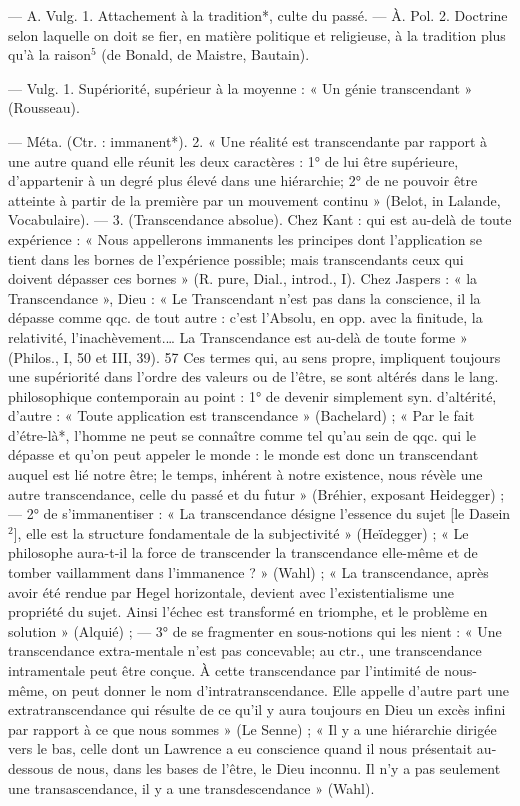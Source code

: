\begin{itemize}[leftmargin=1cm, label=, itemsep=1pt]
 — A. Vulg. 1. Attachement à la tradition*, culte du
passé. — À. Pol. 2. Doctrine selon
laquelle on doit se fier, en matière
politique et religieuse, à la tradition
plus qu’à la raison$^5$ (de Bonald, de
Maistre, Bautain).

 — Vulg. 1.
Supériorité, supérieur à la moyenne :
« Un génie transcendant » (Rousseau).

— Méta. (Ctr. : immanent*). 2.
« Une réalité est transcendante par
rapport à une autre quand elle réunit
les deux caractères : 1° de lui être
supérieure, d’appartenir à un degré
plus élevé dans une hiérarchie; 2° de
ne pouvoir être atteinte à partir de la
première par un mouvement continu »
(Belot, in Lalande, Vocabulaire). —
3. (Transcendance absolue). Chez
Kant : qui est au-delà de toute expérience : « Nous appellerons immanents les principes dont l’application se tient dans les bornes de
l’expérience possible; mais transcendants ceux qui doivent dépasser
ces bornes » (R. pure, Dial., introd.,
I). Chez Jaspers : « la Transcendance », Dieu : « Le Transcendant
n'est pas dans la conscience, il la
dépasse comme qqc. de tout autre :
c’est l’Absolu, en opp. avec la finitude, la relativité, l’inachèvement.…
La Transcendance est au-delà de
toute forme » (Philos., I, 50 et
III, 39). 57 Ces termes qui, au
sens propre, impliquent toujours
une supériorité dans l’ordre des valeurs
ou de l’être, se sont altérés dans
le lang. philosophique contemporain
au point : 1° de devenir simplement syn. d’altérité, d'autre : « Toute
application est transcendance » (Bachelard) ; « Par le fait d’étre-là*,
l’homme ne peut se connaître comme
tel qu’au sein de qqc. qui le dépasse
et qu’on peut appeler le monde : le
monde est donc un transcendant
auquel est lié notre être; le temps,
inhérent à notre existence, nous
révèle une autre transcendance,
celle du passé et du futur » (Bréhier,
exposant Heidegger) ; — 2° de
s’immanentiser : « La transcendance
désigne l'essence du sujet [le Dasein$^2$], elle est la structure fondamentale de la subjectivité » (Heïdegger) ; « Le philosophe aura-t-il la
force de transcender la transcendance elle-même et de tomber vaillamment dans l'immanence ? »
(Wahl) ; « La transcendance, après
avoir été rendue par Hegel horizontale, devient avec l’existentialisme
une propriété du sujet. Ainsi l'échec
est transformé en triomphe, et le
problème en solution » (Alquié) ; —
3° de se fragmenter en sous-notions
qui les nient : « Une transcendance
extra-mentale n’est pas concevable;
au ctr., une transcendance intramentale peut être conçue. À cette
transcendance par l'intimité de
nous-même, on peut donner le nom
d’intratranscendance. Elle appelle
d'autre part une extratranscendance
qui résulte de ce qu’il y aura toujours en Dieu un excès infini par
rapport à ce que nous sommes » (Le
Senne) ; « Il y a une hiérarchie dirigée vers le bas, celle dont un
Lawrence a eu conscience quand il
nous présentait au-dessous de nous,
dans les bases de l'être, le Dieu
inconnu. Il n’y a pas seulement une
transascendance, il y a une transdescendance » (Wahl).


\end{itemize}
